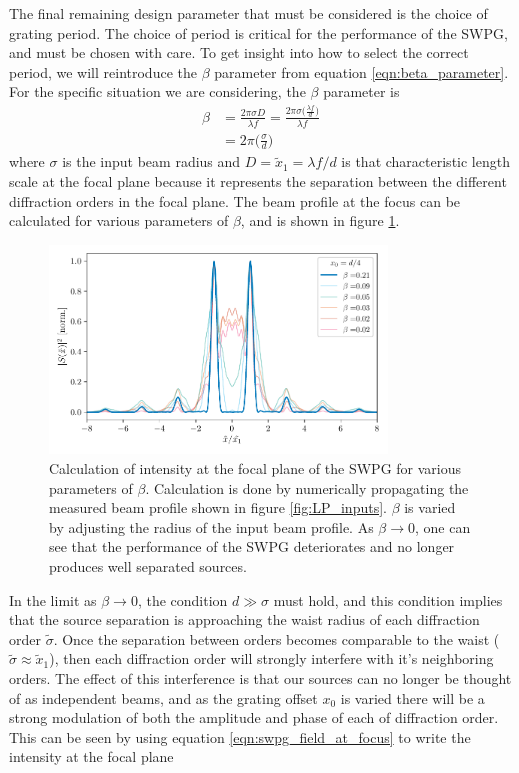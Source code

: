 The final remaining design parameter that must be considered is the choice of grating period. The choice of period is critical for the performance of the SWPG, and must be chosen with care.  To get insight into how to select the correct period, we will reintroduce the $\beta$ parameter from equation \ref{eqn:beta_parameter}.  For the specific situation we are considering, the $\beta$ parameter is
\begin{equation}
\label{eqn:beta_swpg}
	\begin{aligned}
		\beta &= \frac{2\pi \sigma D}{\lambda f} = \frac{2\pi\sigma\big(\frac{\lambda f}{d}\big)}{\lambda f}\\
		&= 2\pi\bigg(\frac{\sigma}{d}\bigg)
	\end{aligned}
\end{equation}
where $\sigma$ is the input beam radius and $D=\tilde{x}_1=\lambda f /d$ is that characteristic length scale at the focal plane because it represents the separation between the different diffraction orders in the focal plane.  The beam profile at the focus can be calculated for various parameters of $\beta$, and is shown in figure \ref{fig:intensity_vs_beta}.
\begin{figure}
	\centering
	\includegraphics[width=0.8\textwidth]{figures/Two_source/focus_intensity_beta_sigma.pdf}
	\caption[Intensity profiles at focal plane of a $0-\pi$ SWPG for various $\beta$ parameters]{Calculation of intensity at the focal plane of the SWPG for various parameters of $\beta$.  Calculation is done by numerically propagating the measured beam profile shown in figure \ref{fig:LP_inputs}.  $\beta$ is varied by adjusting the radius of the input beam profile.  As $\beta\rightarrow0$, one can see that the performance of the SWPG deteriorates and no longer produces well separated sources.}
	\label{fig:intensity_vs_beta}
\end{figure}
In the limit as $\beta\rightarrow0$, the condition $d\gg\sigma$ must hold, and this condition implies that the source separation is approaching the waist radius of each diffraction order $\tilde{\sigma}$.  Once the separation between orders becomes comparable to the waist ($\tilde{\sigma}\approx\tilde{x}_1$), then each diffraction order will strongly interfere with it's neighboring orders.  The effect of this interference is that our sources can no longer be thought of as independent beams, and as the grating offset $x_0$ is varied there will be a strong modulation of both the amplitude and phase of each of diffraction order.  This can be seen by using equation \ref{eqn:swpg_field_at_focus} to write the intensity at the focal plane

